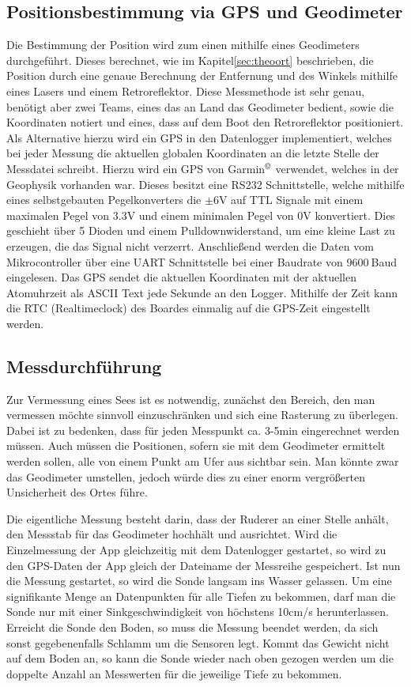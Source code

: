 \documentclass[12pt,a4paper,titlepage,headinclude,bibtotoc]{scrartcl}
\numberwithin{equation}{subsection}
\begin{document}
\subsection{Positionsbestimmung via GPS und Geodimeter}
\label{sec:durchpos}
Die Bestimmung der Position wird zum einen mithilfe eines Geodimeters durchgeführt.
Dieses berechnet, wie im Kapitel\ref{sec:theoort} beschrieben, die Position durch eine genaue Berechnung der Entfernung und des Winkels mithilfe eines Lasers und einem Retroreflektor.
Diese Messmethode ist sehr genau, benötigt aber zwei Teams, eines das an Land das Geodimeter bedient, sowie die Koordinaten notiert und eines, dass auf dem Boot den Retroreflektor positioniert.\\
Als Alternative hierzu wird ein GPS in den Datenlogger implementiert, welches bei jeder Messung die aktuellen globalen Koordinaten an die letzte Stelle der Messdatei schreibt.
Hierzu wird ein GPS von Garmin$^{\copyright}$ verwendet, welches in der Geophysik vorhanden war.
Dieses besitzt eine RS232 Schnittstelle, welche mithilfe eines selbstgebauten Pegelkonverters die $\pm6\si{\volt}$ auf TTL Signale mit einem maximalen Pegel von 3.3\si{\volt} und einem minimalen Pegel von 0\si{\volt} konvertiert.
Dies geschieht über 5 Dioden und einem Pulldownwiderstand, um eine kleine Last zu erzeugen, die das Signal nicht verzerrt.
Anschließend werden die Daten vom Mikrocontroller über eine UART Schnittstelle bei einer Baudrate von 9600$~$Baud eingelesen.
Das GPS sendet die aktuellen Koordinaten mit der aktuellen Atomuhrzeit als ASCII Text jede Sekunde an den Logger.
Mithilfe der Zeit kann die RTC (Realtimeclock) des Boardes einmalig auf die GPS-Zeit eingestellt werden.

\subsection{Messdurchführung}

Zur Vermessung eines Sees ist es notwendig, zunächst den Bereich, den man vermessen möchte sinnvoll einzuschränken und sich eine Rasterung zu überlegen.
Dabei ist zu bedenken, dass für jeden Messpunkt ca. 3-5min eingerechnet werden müssen.
Auch müssen die Positionen, sofern sie mit dem Geodimeter ermittelt werden sollen, alle von einem Punkt am Ufer aus sichtbar sein.
Man könnte zwar das Geodimeter umstellen, jedoch würde dies zu einer enorm vergrößerten Unsicherheit des Ortes führe.

Die eigentliche Messung besteht darin, dass der Ruderer an einer Stelle anhält, den Messstab für das Geodimeter hochhält und ausrichtet.
Wird die Einzelmessung der App gleichzeitig mit dem Datenlogger gestartet, so wird zu den GPS-Daten der App gleich der Dateiname der Messreihe gespeichert.
Ist nun die Messung gestartet, so wird die Sonde langsam ins Wasser gelassen.
Um eine signifikante Menge an Datenpunkten für alle Tiefen zu bekommen, darf man die Sonde nur mit einer Sinkgeschwindigkeit von höchstens 10cm/s herunterlassen.
Erreicht die Sonde den Boden, so muss die Messung beendet werden, da sich sonst gegebenenfalls Schlamm um die Sensoren legt.
Kommt das Gewicht nicht auf dem Boden an, so kann die Sonde wieder nach oben gezogen werden um die doppelte Anzahl an Messwerten für die jeweilige Tiefe zu bekommen.
\end{document}
